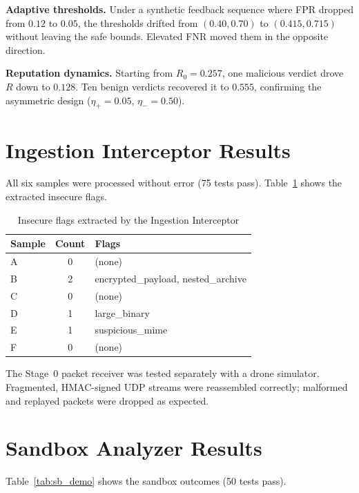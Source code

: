 \documentclass[12pt, a4paper]{report}
\begin{document}
\textbf{Adaptive thresholds.}
Under a synthetic feedback sequence where FPR dropped from $0.12$ to
$0.05$, the thresholds drifted from $(0.40, 0.70)$ to $(0.415, 0.715)$
without leaving the safe bounds. Elevated FNR moved them in the
opposite direction.

\textbf{Reputation dynamics.}
Starting from $R_0 = 0.257$, one malicious verdict drove $R$ down to
$0.128$. Ten benign verdicts recovered it to $0.555$, confirming
the asymmetric design ($\eta_+ = 0.05$, $\eta_- = 0.50$).

\section{Ingestion Interceptor Results}

All six samples were processed without error (75 tests pass).
Table~\ref{tab:ii_flags} shows the extracted insecure flags.

\begin{table}[H]
\centering
\caption{Insecure flags extracted by the Ingestion Interceptor}
\label{tab:ii_flags}
\begin{tabular}{@{}lcl@{}}
\toprule
\textbf{Sample} & \textbf{Count} & \textbf{Flags} \\
\midrule
A & 0 & (none) \\
B & 2 & encrypted\_payload, nested\_archive \\
C & 0 & (none) \\
D & 1 & large\_binary \\
E & 1 & suspicious\_mime \\
F & 0 & (none) \\
\bottomrule
\end{tabular}
\end{table}

The Stage~0 packet receiver was tested separately with a drone
simulator. Fragmented, HMAC-signed UDP streams were reassembled
correctly; malformed and replayed packets were dropped as expected.

\section{Sandbox Analyzer Results}

Table~\ref{tab:sb_demo} shows the sandbox outcomes (50 tests pass).
\end{document}
